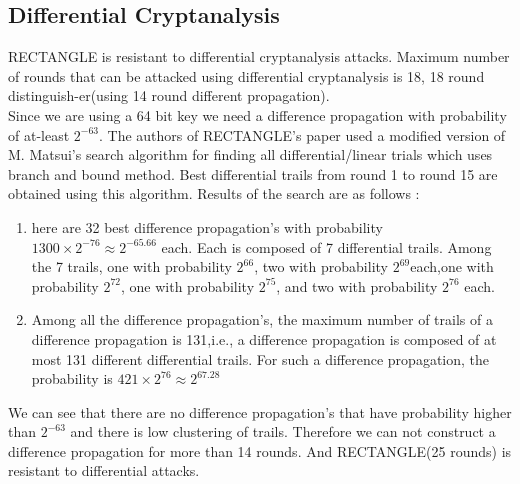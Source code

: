 \documentclass[final]{transcrypto}
\begin{document}
\subsection{Differential Cryptanalysis}
\label{diff}
RECTANGLE is resistant to differential cryptanalysis attacks. Maximum number of rounds that can be attacked using differential cryptanalysis is 18, 18 round distinguish-er(using 14 round different propagation).\\
Since we are using a 64 bit key we need a difference propagation with probability of at-least $2^{-63}$.
The authors of RECTANGLE's paper used a modified version of M. Matsui's search algorithm for finding all differential/linear trials which uses branch and bound method. Best differential trails from round 1 to round 15 are obtained using this algorithm. Results of the search are as follows \cite{rectangle}: 
\begin{enumerate}
 \item here are 32 best difference propagation's with probability $1300\times 2^{-76}\approx 2^{-65.66}$ each. Each is composed of 7 differential trails. Among the 7 trails, one with probability $2^{66}$, two with probability $2^{69}$each,one with probability $2^{72}$, one with probability $2^{75}$, and two with probability $2^{76}$ each.
\item Among all the difference propagation's, the maximum number of trails of a difference propagation is 131,i.e., a difference propagation is composed of at most 131 different differential trails. For such a difference propagation, the probability is $421\times 2^{76}\approx 2^{67.28}$
\end{enumerate}
We can see that there are no difference propagation's that have probability higher than $2^{-63}$ and there is low clustering of trails. Therefore we can not construct a difference propagation for more than 14 rounds. And RECTANGLE(25 rounds) is resistant to differential attacks.
\end{document}
